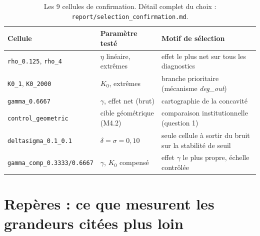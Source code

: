 \documentclass[11pt,a4paper]{article}
\newcommand{\code}[1]{\texttt{#1}}
\begin{document}
\begin{table}[h]
\centering
\small
\begin{tabularx}{\textwidth}{@{}llX@{}}
\toprule
Cellule & Paramètre testé & Motif de sélection \\
\midrule
\code{rho\_0.125}, \code{rho\_4} & $\eta$ linéaire, extrêmes & effet le plus net sur tous les diagnostics \\
\code{K0\_1}, \code{K0\_2000} & $K_0$, extrêmes & branche prioritaire (mécanisme \emph{deg\_out}) \\
\code{gamma\_0.6667} & $\gamma$, effet net (brut) & cartographie de la concavité \\
\code{control\_geometric} & cible géométrique (M4.2) & comparaison institutionnelle (question 1) \\
\code{deltasigma\_0.1\_0.1} & $\delta=\sigma=0{,}10$ & seule cellule à sortir du bruit sur la stabilité de seuil \\
\code{gamma\_comp\_0.3333/0.6667} & $\gamma$, $K_0$ compensé & effet $\gamma$ le plus propre, échelle contrôlée \\
\bottomrule
\end{tabularx}
\caption{Les 9 cellules de confirmation. Détail complet du choix :
\code{report/selection\_confirmation.md}.}
\end{table}

\section{Repères : ce que mesurent les grandeurs citées plus loin}
\label{sec:reperes}
\end{document}
